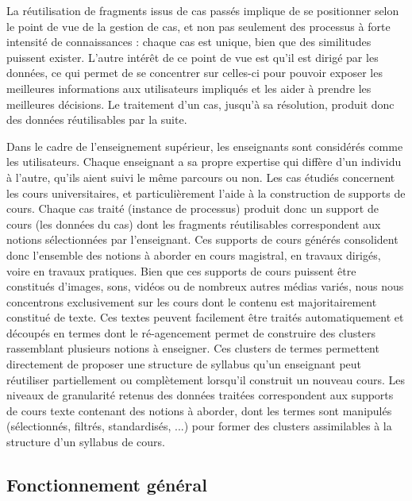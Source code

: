 
La réutilisation de fragments issus de cas passés implique de se positionner selon le point de vue de la gestion de cas, et non pas seulement des processus à forte intensité de connaissances : chaque cas est unique, bien que des similitudes puissent exister.
L'autre intérêt de ce point de vue est qu'il est dirigé par les données, ce qui permet de se concentrer sur celles-ci pour pouvoir exposer les meilleures informations aux utilisateurs impliqués et les aider à prendre les meilleures décisions.
Le traitement d'un cas, jusqu'à sa résolution, produit donc des données réutilisables par la suite.

\bigskip

Dans le cadre de l'enseignement supérieur, les enseignants sont considérés comme les utilisateurs.
Chaque enseignant a sa propre expertise qui diffère d'un individu à l'autre, qu'ils aient suivi le même parcours ou non.
Les cas étudiés concernent les cours universitaires, et particulièrement l'aide à la construction de supports de cours.
Chaque cas traité (instance de processus) produit donc un support de cours (les données du cas) dont les fragments réutilisables correspondent aux notions sélectionnées par l'enseignant.
Ces supports de cours générés consolident donc l'ensemble des notions à aborder en cours magistral, en travaux dirigés, voire en travaux pratiques.
Bien que ces supports de cours puissent être constitués d'images, sons, vidéos ou de nombreux autres médias variés, nous nous concentrons exclusivement sur les cours dont le contenu est majoritairement constitué de texte.
Ces textes peuvent facilement être traités automatiquement et découpés en termes dont le ré-agencement permet de construire des clusters rassemblant plusieurs notions à enseigner.
Ces clusters de termes permettent directement de proposer une structure de syllabus qu'un enseignant peut réutiliser partiellement ou complètement lorsqu'il construit un nouveau cours.
Les niveaux de granularité retenus des données traitées correspondent aux supports de cours texte contenant des notions à aborder, dont les termes sont manipulés (sélectionnés, filtrés, standardisés, ...) pour former des clusters assimilables à la structure d'un syllabus de cours.



\subsection{Fonctionnement général}
\label{subsection:CREA:FonctionnementGeneralSemantique}


